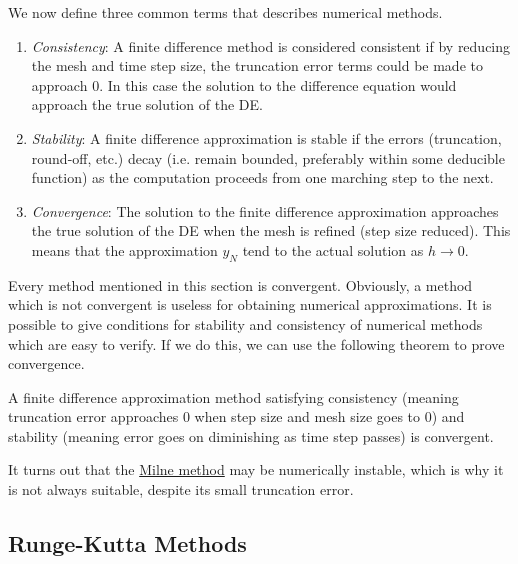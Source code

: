 \documentclass{article}
\newcounter{theorem}[section]
\newcounter{definition}[section]
\begin{document}
    \begin{definition}
      \label{def:consistency-stability-convergence}
    We now define three common terms that describes numerical methods. 
    \begin{enumerate}
        \item \textit{Consistency}: A finite difference method is considered consistent if by reducing the mesh and time step size, the truncation error terms could be made to approach $0$. In this case the solution to the difference equation would approach the true solution of the DE. 
        \item \textit{Stability}: A finite difference approximation is stable if the errors (truncation, round-off, etc.) decay (i.e. remain bounded, preferably within some deducible function) as the computation proceeds from one marching step to the next. 
        \item \textit{Convergence}: The solution to the finite difference approximation approaches the true solution of the DE when the mesh is refined (step size reduced). This means that the approximation $y_N$ tend to the actual solution as $h \rightarrow 0$. 
    \end{enumerate}
    \end{definition}

    Every method mentioned in this section is convergent. Obviously, a method which is not convergent is useless for obtaining numerical approximations. It is possible to give conditions for stability and consistency of numerical methods which are easy to verify. If we do this, we can use the following theorem to prove convergence. 

    \begin{theorem}
      \label{thm:lax-equivalence-theorem}
    A finite difference approximation method satisfying consistency (meaning truncation error approaches $0$ when step size and mesh size goes to $0$) and stability (meaning error goes on diminishing as time step passes) is convergent. 
    \end{theorem}

    It turns out that the \hyperref[thm:milne-method]{Milne method} may be numerically instable, which is why it is not always suitable, despite its small truncation error. 

  \subsection{Runge-Kutta Methods}
\end{document}
